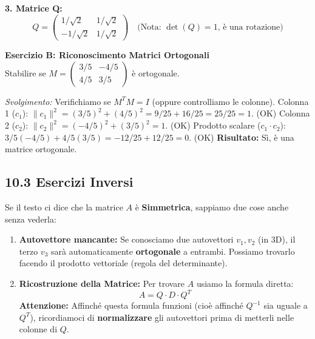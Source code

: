 \documentclass[10pt,a4paper]{article}
\begin{document}
\textbf{3. Matrice Q:}
\[ Q = \begin{pmatrix} 1/\sqrt{2} & 1/\sqrt{2} \\ -1/\sqrt{2} & 1/\sqrt{2} \end{pmatrix} \quad \text{(Nota: } \det(Q)=1 \text{, è una rotazione)} \]

\vspace{0.3cm}

\textbf{Esercizio B: Riconoscimento Matrici Ortogonali}
\\ Stabilire se $M = \begin{pmatrix} 3/5 & -4/5 \\ 4/5 & 3/5 \end{pmatrix}$ è ortogonale.

\textit{Svolgimento:}
Verifichiamo se $M^T M = I$ (oppure controlliamo le colonne).
Colonna 1 ($c_1$): $\|c_1\|^2 = (3/5)^2 + (4/5)^2 = 9/25 + 16/25 = 25/25 = 1$. (OK)
Colonna 2 ($c_2$): $\|c_2\|^2 = (-4/5)^2 + (3/5)^2 = 1$. (OK)
Prodotto scalare ($c_1 \cdot c_2$): $3/5(-4/5) + 4/5(3/5) = -12/25 + 12/25 = 0$. (OK)
\textbf{Risultato:} Sì, è una matrice ortogonale.

\subsection*{10.3 Esercizi Inversi}
\begin{tcolorbox}[colback=blue!5!white,colframe=blue!75!black,title=\textbf{Sfruttare le proprietà}]
Se il testo ci dice che la matrice $A$ è \textbf{Simmetrica}, sappiamo due cose anche senza vederla:
\begin{enumerate}
    \item \textbf{Autovettore mancante:}
    Se conosciamo due autovettori $v_1, v_2$ (in 3D), il terzo $v_3$ sarà automaticamente \textbf{ortogonale} a entrambi. Possiamo trovarlo facendo il prodotto vettoriale (regola del determinante).
    
    \item \textbf{Ricostruzione della Matrice:}
    Per trovare $A$ usiamo la formula diretta:
    \[ A = Q \cdot D \cdot Q^T \]
    \textbf{Attenzione:} Affinché questa formula funzioni (cioè affinché $Q^{-1}$ sia uguale a $Q^T$), ricordiamoci di \textbf{normalizzare} gli autovettori prima di metterli nelle colonne di $Q$.
\end{enumerate}
\end{tcolorbox}

\vspace{0.4cm}
\end{document}
